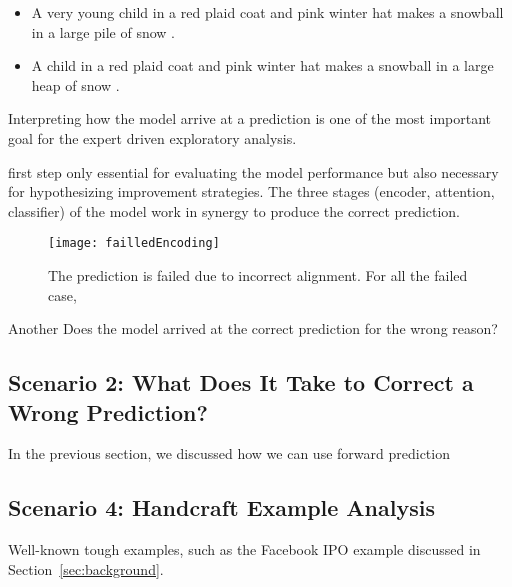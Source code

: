 \begin{itemize}
\item A very young child in a red plaid coat and pink winter hat makes a snowball in a large pile of snow .
\item A child in a red plaid coat and pink winter hat makes a snowball in a large heap of snow .
\end{itemize}

Interpreting how the model arrive at a prediction is one of the most important goal for the expert driven exploratory analysis.
%

 first step  only essential for evaluating the model performance but also necessary for hypothesizing improvement strategies.
%
The three stages (encoder, attention, classifier) of the model work in synergy to produce the correct prediction.

\begin{figure*}[t]
\centering
\vspace{-2mm}
 \texttt{[image: failledEncoding]}
 \caption{
The prediction is failed due to incorrect alignment. For all the failed case, 
 }
\label{fig:failedEncoding}
\end{figure*}



Another
Does the model arrived at the correct prediction for the wrong reason?

\subsection{Scenario 2: What Does It Take to Correct a Wrong Prediction?}
In the previous section, we discussed how we can use forward prediction



\subsection{Scenario 4: Handcraft Example Analysis}
Well-known tough examples, such as the Facebook IPO example discussed in Section~\ref{sec:background}.

